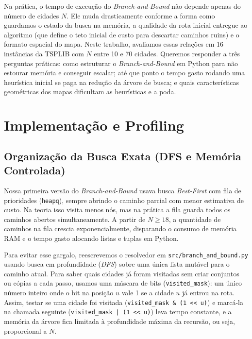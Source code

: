 \documentclass[12pt]{article}
\begin{document}
Na prática, o tempo de execução do \textit{Branch-and-Bound} não depende apenas do número de cidades $N$. Ele muda drasticamente conforme a forma como guardamos o estado da busca na memória, a qualidade da rota inicial entregue ao algoritmo (que define o teto inicial de custo para descartar caminhos ruins) e o formato espacial do mapa. Neste trabalho, avaliamos essas relações em 16 instâncias da TSPLIB com $N$ entre 10 e 70 cidades. Queremos responder a três perguntas práticas: como estruturar o \textit{Branch-and-Bound} em Python para não estourar memória e conseguir escalar; até que ponto o tempo gasto rodando uma heurística inicial se paga na redução da árvore de busca; e quais características geométricas dos mapas dificultam as heurísticas e a poda.

\section{Implementação e Profiling}

\subsection{Organização da Busca Exata (DFS e Memória Controlada)}

Nossa primeira versão do \textit{Branch-and-Bound} usava busca \textit{Best-First} com fila de prioridades (\texttt{heapq}), sempre abrindo o caminho parcial com menor estimativa de custo. Na teoria isso visita menos nós, mas na prática a fila guarda todos os caminhos abertos simultaneamente. A partir de $N \ge 18$, a quantidade de caminhos na fila crescia exponencialmente, disparando o consumo de memória RAM e o tempo gasto alocando listas e tuplas em Python.

Para evitar esse gargalo, reescrevemos o resolvedor em \texttt{src/branch\_and\_bound.py} usando busca em profundidade (\textit{DFS}) sobre uma única lista mutável para o caminho atual. Para saber quais cidades já foram visitadas sem criar conjuntos ou cópias a cada passo, usamos uma máscara de bits (\texttt{visited\_mask}): um único número inteiro onde o bit na posição $u$ vale 1 se a cidade $u$ já entrou na rota. Assim, testar se uma cidade foi visitada (\texttt{visited\_mask \& (1 {<}{<} u)}) e marcá-la na chamada seguinte (\texttt{visited\_mask | (1 {<}{<} u)}) leva tempo constante, e a memória da árvore fica limitada à profundidade máxima da recursão, ou seja, proporcional a $N$.
\end{document}
